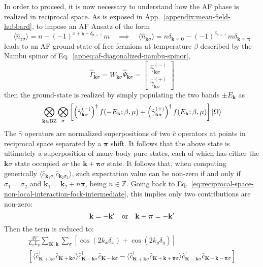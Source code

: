 In order to proceed, it is now necessary to understand how the AF phase is realized in reciprocal space. As is exposed in App.~\ref{appendix:mean-field-hubbard}, to impose an AF Ansatz of the form
\[
	\langle \hat n_{\mathbf{r}\sigma} \rangle = n - (-1)^{x+y+\delta_{\sigma=\uparrow}} m
	\quad\implies\quad
	\langle \hat n_{\mathbf{k}\sigma} \rangle = n\delta_{\mathbf{k}=\mathbf{0}} - (-1)^{\delta_{\sigma=\uparrow}} m\delta_{\mathbf{k}=\bm{\pi}}
\]
leads to an AF ground-state of free fermions at temperature $\beta$ described by the Nambu spinor of Eq.~\eqref{appeq:af-diagonalized-nambu-spinor},
\[
	\hat\Gamma_{\mathbf{k}\sigma} = W_{\mathbf{k}\sigma} \hat \Psi_{\mathbf{k}\sigma} = \begin{bmatrix}
		\hat \gamma_{\mathbf{k}\sigma}^{(-)} \\ \hat \gamma_{\mathbf{k}\sigma}^{(+)}
	\end{bmatrix}
\]
then the ground-state is realized by simply populating the two bands $\pm E_\mathbf{k}$ as
\[
	\bigotimes_{\mathbf{k}\in\mathrm{BZ}} \bigotimes_\sigma \left[
		\left(\hat \gamma_{\mathbf{k}\sigma}^{(-)}\right)^\dagger f(-E_\mathbf{k};\beta,\mu) + \left(\hat \gamma_{\mathbf{k}\sigma}^{(+)}\right)^\dagger f(E_\mathbf{k};\beta,\mu)
	\right] \ket{\Omega}
\]
The $\hat\gamma$ operators are normalized superpositions of two $\hat c$ operators at points in reciprocal space separated by a $\bm{\pi}$ shift. It follows that the above state is ultimately a superposition of many-body pure states, each of which has either the $\mathbf{k}\sigma$ state occupied \textit{or} the $\mathbf{k}+\bm{\pi}\sigma$ state. It follows that, when computing generically $\langle \hat c_{\mathbf{k}_1\sigma_1} \hat c_{\mathbf{k}_2\sigma_2} \rangle$, such expectation value can be non-zero if and only if $\sigma_1 = \sigma_2$ and $\mathbf{k}_1 = \mathbf{k}_2 + n\bm{\pi}$, being $n \in \mathbb{Z}$. Going back to Eq.~\eqref{eq:reciprocal-space-non-local-interaction-fock-intermediate}, this implies only two contributions are non-zero:
\[
	\mathbf{k} = -\mathbf{k}'
	\qq{or}
	\mathbf{k}+\bm{\pi} = -\mathbf{k}'
\]
Then the term is reduced to:
\begin{multline*}
	\frac{4V}{L_x L_y} \sum_{\mathbf{K}, \mathbf{k}} \sum_\sigma \left[
		\cos \left(
			2k_x \delta_x
		\right)	+ \cos \left(
			2k_y \delta_y
		\right)	
	\right]	\\
	\left[
		\langle
			\hat c_{\mathbf{K}+\mathbf{k} \sigma}^\dagger 
			\hat 	c_{\mathbf{K}+\mathbf{k} \sigma}
		\rangle
		\hat c_{\mathbf{K}-\mathbf{k} \sigma}^\dagger  \hat c_{\mathbf{K}-\mathbf{k}\sigma}
		-
		\langle
			\hat c_{\mathbf{K}+\mathbf{k} \sigma}^\dagger 
			\hat 	c_{\mathbf{K}+\mathbf{k}+\bm{\pi} \sigma}
		\rangle
		\hat c_{\mathbf{K}-\mathbf{k} \sigma}^\dagger  \hat c_{\mathbf{K}-\mathbf{k}-\bm{\pi}\sigma}
	\right]
\end{multline*}
